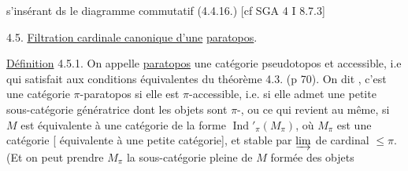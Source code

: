 s'insérant ds le diagramme commutatif
(4.4.16.)
[cf SGA 4 I 8.7.3]

4.5. \uline{Filtration cardinale canonique d'une}  \uline{paratopos}.

\uline{Définition} 4.5.1. On appelle \uline{paratopos} une catégorie   pseudotopos et  accessible, i.e qui satisfait aux conditions équivalentes du théorème 4.3. (p 70).
On dit  , c'est une \deleted{$\pi$-}catégorie $\pi$-paratopos si elle est $\pi$-accessible, i.e. si elle admet une petite sous-catégorie génératrice dont les objets sont $\pi$-, ou ce qui revient au même, si $M$ est équivalente à une catégorie de la forme $\operatorname{Ind}'_\pi(M_\pi)$, où $M_\pi$ est une  catégorie [ équivalente à une petite catégorie], et stable par  $\varinjlim$ de cardinal $\leq\pi$. (Et on peut prendre  $M_\pi$ la sous-catégorie pleine de $M$ formée des objets
